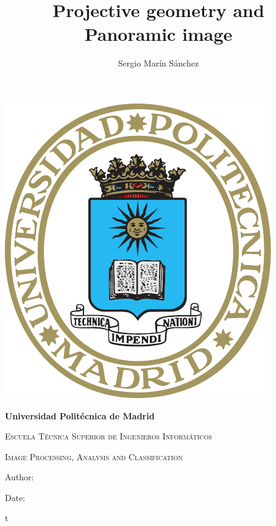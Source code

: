 \documentclass[12pt]{article}
\title{ Projective geometry and Panoramic image %
}
\author{ Sergio Marín Sánchez %
}
\begin{document}
\begin{titlepage}
    \centering
    \phantom{a}
    \vspace{2cm}
    {\includegraphics[scale=0.9]{ESCUDO_UPM.pdf}\par}
    \vspace{2cm}
    {\bfseries\LARGE Universidad Politécnica de Madrid \par}
    \vspace{0.75cm}
    {\scshape\Large Escuela Técnica Superior de Ingenieros Informáticos \par}
    \vfill
    {\scshape\Huge \thetitle \par}
    {\scshape\Large Image Processing, Analysis and Classification \par}
    \vfill
    {\large Author: \theauthor \par}
    \vspace{0.2cm}
    {\large Date:  \par}
\end{titlepage}

\pagestyle{empty}
\tableofcontents
\clearpage

\setcounter{page}{1}

\pagestyle{fancy}











\clearpage

\pagestyle{empty}
\renewcommand{\thepage}{}t

\nocite{*}

\printbibliography[heading=bibintoc]
\end{document}
